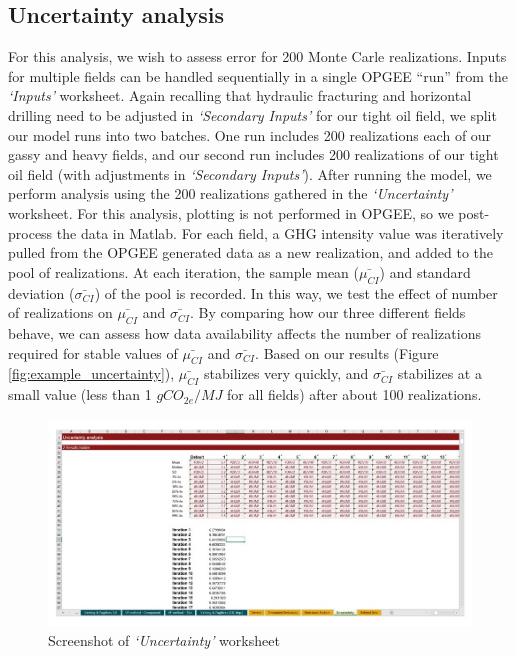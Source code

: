 \documentclass[11pt]{report}
\newcommand{\sheet}[1]{\textit{`{#1}'}}
\begin{document}
\clearpage

\subsection{Uncertainty analysis} 

For this analysis, we wish to assess error for 200 Monte Carle realizations. Inputs for multiple fields can be handled sequentially in a single OPGEE ``run'' from the \sheet{Inputs} worksheet. Again recalling that hydraulic fracturing and horizontal drilling need to be adjusted in \sheet{Secondary Inputs} for our tight oil field, we split our model runs into two batches. One run includes 200 realizations each of our gassy and heavy fields, and our second run includes 200 realizations of our tight oil field (with adjustments in \sheet{Secondary Inputs}).
After running the model, we perform analysis using the 200 realizations gathered in the \sheet{Uncertainty} worksheet. For this analysis, plotting is not performed in OPGEE, so we post-process the data in Matlab. For each field, a GHG intensity value was iteratively pulled from the OPGEE generated data as a new realization, and added to the pool of realizations. At each iteration, the sample mean ($\bar{\mu_{CI}}$) and standard deviation ($\bar{\sigma_{CI}}$) of the pool is recorded. In this way, we test the effect of number of realizations on $\bar{\mu_{CI}}$ and $\bar{\sigma_{CI}}$. By comparing how our three different fields behave, we can assess how data availability affects the number of realizations required for stable values of $\bar{\mu_{CI}}$ and $\bar{\sigma_{CI}}$. Based on our results (Figure \ref{fig:example_uncertainty}), $\bar{\mu_{CI}}$ stabilizes very quickly, and $\bar{\sigma_{CI}}$ stabilizes at a small value (less than 1 $gCO_{2e}/MJ$ for all fields) after about 100 realizations.

\begin{figure}[h]
\includegraphics[width=1\columnwidth]{documentation/images/User_Guide_figs/uncertaintypage_2.jpg}
\caption{Screenshot of \sheet{Uncertainty} worksheet}
\label{fig:uncertaintypage}
\end{figure}
\end{document}
